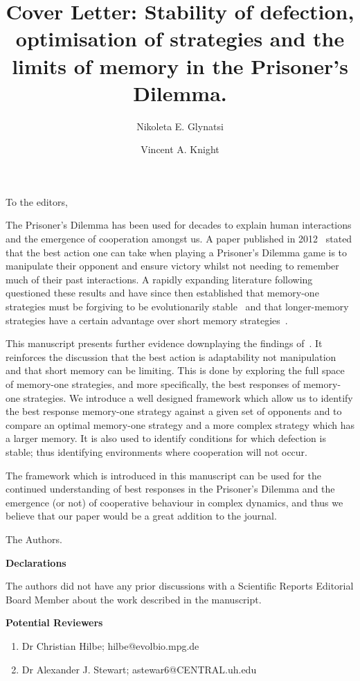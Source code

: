 \documentclass{article}
\title{Cover Letter: Stability of defection, optimisation of strategies and the limits of
memory in the Prisoner's Dilemma.}
\author[1, *]{Nikoleta E. Glynatsi}
\author[1]{Vincent A. Knight}
\affil[1]{Cardiff University, School of Mathematics, Cardiff, United Kingdom}
\affil[*]{Corresponding author: Nikoleta E. Glynatsi, glynatsine@cardiff.ac.uk}
\date{}
\begin{document}
 
\maketitle

To the editors,
 
The Prisoner's Dilemma has been used for decades to explain human interactions
and the emergence of cooperation amongst us. A paper published in
2012~\cite{Press2012} stated that the best action one can take when playing a
Prisoner's Dilemma game is to manipulate their opponent and ensure victory
whilst not needing to remember much of their past interactions. A rapidly
expanding literature following~\cite{Press2012} questioned these results and
have since then established that memory-one strategies must be forgiving to be
evolutionarily stable~\cite{adami2013} and that longer-memory strategies have
a certain advantage over short memory strategies~\cite{Hilbe2017}.

This manuscript presents further evidence downplaying the findings
of~\cite{Press2012}. It reinforces the discussion that the best action is
adaptability not manipulation and that short memory can be limiting. This is
done by exploring the full space of memory-one strategies, and more specifically, the best
responses of memory-one strategies. We introduce a well designed framework which
allow us to identify the best response memory-one strategy against a given set
of opponents and to compare an optimal memory-one strategy and a more complex
strategy which has a larger memory. It is also used to identify conditions for
which defection is stable; thus identifying environments where cooperation will
not occur.
 
The framework which is introduced in this manuscript can be used for the
continued understanding of best responses in the Prisoner’s Dilemma and the
emergence (or not) of cooperative behaviour in complex dynamics, and thus we
believe that our paper would be a great addition to the journal.
 
The Authors.

\textbf{Declarations}

The authors did not have any prior discussions with a  Scientific Reports Editorial Board Member
about the work described in the manuscript.

\textbf{Potential Reviewers}

\begin{enumerate}
    \item Dr Christian Hilbe; hilbe@evolbio.mpg.de
    \item Dr Alexander J. Stewart; astewar6@CENTRAL.uh.edu
\end{enumerate}

 


\end{document}
